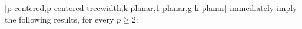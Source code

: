 \documentclass{patmorin}
\renewcommand{\ge}{\geqslant}
\renewcommand{\le}{\leqslant}
\begin{document}
% 
% 

\cref{p-centered,p-centered-treewidth,k-planar,1-planar,g-k-planar} immediately imply the following results, for every $p\ge 2$:
\end{document}
